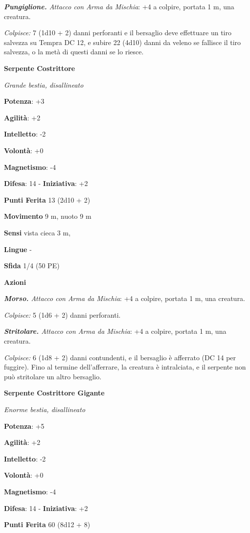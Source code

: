 \begin{multicols}{2}
\emph{\textbf{Pungiglione.} Attacco con Arma da Mischia}: +4 a colpire,
portata 1 m, una creatura.

\emph{Colpisce:} 7 (1d10 + 2) danni perforanti e il bersaglio deve
effettuare un tiro salvezza su Tempra DC 12, e subire 22 (4d10)
danni da veleno se fallisce il tiro salvezza, o la metà di questi danni
se lo riesce.

\textbf{Serpente Costrittore}

\emph{Grande bestia, disallineato}

\textbf{Potenza}: +3

\textbf{Agilità}: +2

\textbf{Intelletto}: -2

\textbf{Volontà}: +0

\textbf{Magnetismo}: -4

\textbf{Difesa}: 14 - \textbf{Iniziativa}: +2

\textbf{Punti Ferita} 13 (2d10 + 2)

\textbf{Movimento} 9 m, nuoto 9 m

\textbf{Sensi} vista cieca 3 m, 

\textbf{Lingue} -

\textbf{Sfida} 1/4 (50 PE)\smallskip

\smallskip\textbf{Azioni}

\emph{\textbf{Morso.} Attacco con Arma da Mischia}: +4 a colpire,
portata 1 m, una creatura.

\emph{Colpisce:} 5 (1d6 + 2) danni perforanti.

\emph{\textbf{Stritolare.} Attacco con Arma da Mischia}: +4 a colpire,
portata 1 m, una creatura.

\emph{Colpisce:} 6 (1d8 + 2) danni contundenti, e il bersaglio è
afferrato (DC 14 per fuggire). Fino al termine dell'afferrare, la
creatura è intralciata, e il serpente non può stritolare un altro
bersaglio.

\textbf{Serpente Costrittore Gigante}

\emph{Enorme bestia, disallineato}

\textbf{Potenza}: +5

\textbf{Agilità}: +2

\textbf{Intelletto}: -2

\textbf{Volontà}: +0

\textbf{Magnetismo}: -4

\textbf{Difesa}: 14 - \textbf{Iniziativa}: +2

\textbf{Punti Ferita} 60 (8d12 + 8)


\end{multicols}
